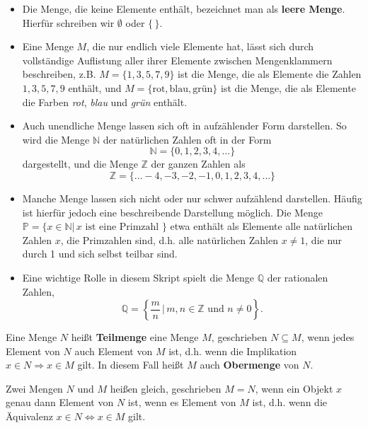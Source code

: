 \begin{beispiel}

\begin{itemize}
\item Die Menge, die keine Elemente enthält, bezeichnet man als \textbf{leere Menge}. Hierfür schreiben wir
$\emptyset$ oder $\{ \, \}$.
\item Eine Menge $M$, die nur endlich viele Elemente hat, lässt sich durch vollständige Auflistung aller 
ihrer Elemente zwischen Mengenklammern beschreiben, z.B. $M = \{ 1, 3, 5, 7, 9 \}$ ist die Menge, die als Elemente 
die Zahlen $1, 3, 5, 7, 9$ enthält, und $M = \{ \textrm{rot}, \textrm{blau}, \textrm{grün} \}$ ist die Menge, 
die als Elemente die Farben \textit{rot}, \textit{blau} und \textit{grün} enthält.
\item Auch unendliche Menge lassen sich oft in aufzählender Form darstellen. So wird die Menge $\mathbb N$ 
der natürlichen Zahlen oft in der Form 
  	$$ \mathbb N = \{ 0, 1, 2, 3, 4, \ldots \} $$
dargestellt, und die Menge $\mathbb Z$ der ganzen Zahlen als
  	$$ \mathbb Z = \{ \ldots -4, -3, -2, -1, 0, 1, 2, 3, 4, \ldots \} $$
\item Manche Menge lassen sich nicht oder nur schwer aufzählend darstellen. Häufig ist hierfür jedoch eine 
beschreibende Darstellung möglich. Die Menge $\mathbb P = \{ x \in \mathbb N \vert \, x 
\textrm{ ist eine Primzahl }\}$ 
etwa enthält als Elemente alle natürlichen Zahlen $x$, die Primzahlen sind, d.h. alle natürlichen Zahlen
$x \neq 1$, die nur durch 1 und sich selbst teilbar sind.  
\item Eine wichtige Rolle in diesem Skript spielt die Menge $\mathbb Q$ der rationalen Zahlen, 
  	$$ \mathbb Q = \left\{ \frac {m}{n} \, \big\vert \, m, n \in \mathbb Z \textrm{ und } n \neq 0 \right\}. $$ 
\end{itemize}
\end{beispiel}

\begin{definition} Eine Menge $N$ heißt \textbf{Teilmenge} eine Menge $M$, geschrieben 
$N \subseteq M$, wenn jedes Element von $N$ auch Element von $M$ ist, d.h. wenn die Implikation 
$x \in N \Longrightarrow x \in M$ gilt. In diesem Fall heißt $M$ auch \textbf{Obermenge} 
von $N$.
\end{definition}

\begin{definition} Zwei Mengen $N$ und $M$ heißen gleich, geschrieben $M = N$, wenn ein Objekt $x$ genau 
dann Element von $N$ ist, wenn es Element von $M$ ist, d.h. wenn die Äquivalenz $x \in N \iff x \in M$ 
gilt.
\end{definition}

